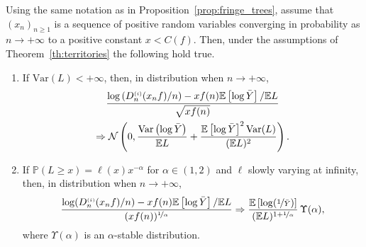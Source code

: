 \documentclass[AHL,Unicode,longabstracts,published]{cedram}
\newcommand{\sss}{\ensuremath{\scriptscriptstyle}}
\newcommand{\bbP}{\mathbb{P}}
\newcommand{\bbE}{\mathbb{E}}
\newcommand{\clN}{\mathcal{N}}
\newcommand{\Var}{\mathrm{Var}}
\newcommand*{\romanenumi}{\renewcommand*{\theenumi}{\roman{enumi}}}
\begin{document}
\begin{lemm}\label{lem:CLT_random_index}
Using the same notation as in Proposition~\ref{prop:fringe_trees}, assume that $(x_n)_{n\geq 1}$ is a sequence of positive random variables converging in probability as $n\to+\infty$ to a positive constant $x<C(f)$. Then, under the assumptions of Theorem~\ref{th:territories} the following hold true.
\begin{enumerate}\romanenumi
\item\label{lemm3.1.1} If $\Var(L)<+\infty$, then, in distribution when $n\to+\infty$,
\begin{multline*}
\frac{\log \left(D_n^{\sss (i)}(x_n f)/n\right)-xf(n)\bbE\left[\log \bar Y\right]/\bbE L}{\sqrt{xf(n)}}\\
\Rightarrow \clN\left(0, \frac{\Var\left(\log \bar Y\right)}{\bbE L}+\frac{\bbE\left[\log \bar Y\right]^2\Var(L)}{(\bbE L)^2}\right).
\end{multline*}

\item\label{lemm3.1.2} If $\bbP(L\geq x)= \ell(x)x^{-\alpha}$ for $\alpha\in(1,2)$ and $\ell$ slowly varying at infinity, then, in distribution when $n\to+\infty$,
\[
\frac{\log (D_n^{\sss (i)}(x_n f)/n)-xf(n)\bbE\left[\log \bar Y\right]/\bbE L}{(xf(n))^{\nicefrac1\alpha}}
\Rightarrow \frac{\bbE\left[\log(\nicefrac1{\bar Y})\right]}{(\bbE L)^{1+\nicefrac1\alpha}}\,\Upsilon(\alpha),
\]
where $\Upsilon(\alpha)$ is an $\alpha$-stable distribution.
\end{enumerate}
\end{lemm}
\end{document}
